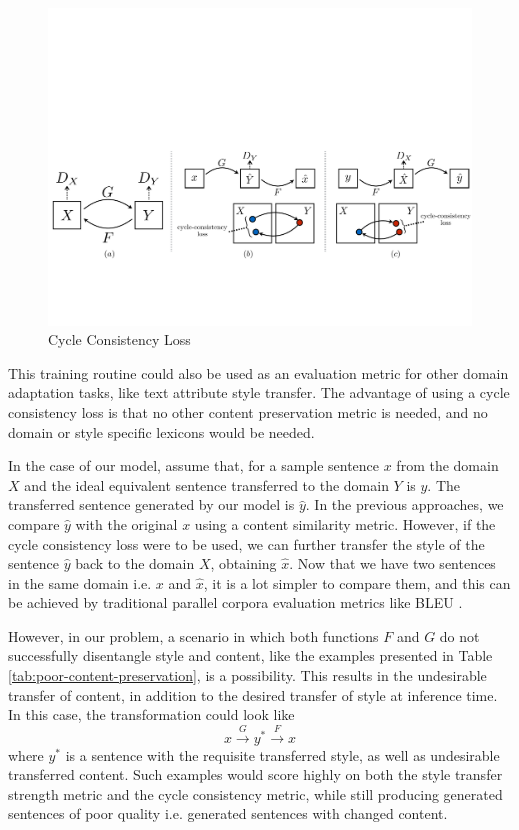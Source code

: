 \begin{figure}[ht]
	\centering
	\includegraphics[width=\textwidth]{images/cycle-consistency}
	\caption{\label{fig:cycle-consistency} Cycle Consistency Loss}
\end{figure}

This training routine could also be used as an evaluation metric for other domain adaptation tasks, like text attribute style transfer. The advantage of using a cycle consistency loss is that no other content preservation metric is needed, and no domain or style specific lexicons would be needed.

In the case of our model, assume that, for a sample sentence $x$ from the domain $X$ and the ideal equivalent sentence transferred to the domain $Y$ is $y$. The transferred sentence generated by our model is $\hat{y}$. In the previous approaches, we compare $\hat{y}$ with the original $x$ using a content similarity metric. However, if the cycle consistency loss were to be used, we can further transfer the style of the sentence $\hat{y}$ back to the domain $X$, obtaining $\hat{x}$. Now that we have two sentences in the same domain i.e. $x$ and $\hat{x}$, it is a lot simpler to compare them, and this can be achieved by traditional parallel corpora evaluation metrics like BLEU \citep{papineni2002bleu}.

However, in our problem, a scenario in which both functions $F$ and $G$ do not successfully disentangle style and content, like the examples presented in Table \ref{tab:poor-content-preservation}, is a possibility. This results in the undesirable transfer of content, in addition to the desired transfer of style at inference time. In this case, the transformation could look like
\begin{equation*}
	x \xrightarrow{G} y^* \xrightarrow{F} x
\end{equation*}
where $y^*$ is a sentence with the requisite transferred style, as well as undesirable transferred content. Such examples would score highly on both the style transfer strength metric and the cycle consistency metric, while still producing generated sentences of poor quality i.e. generated sentences with changed content.

